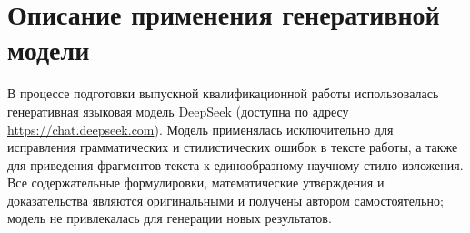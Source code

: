 \documentclass{article}
\theoremstyle{definition}
\begin{document}
\section*{Описание применения генеративной модели}

В процессе подготовки выпускной квалификационной работы использовалась генеративная языковая модель DeepSeek (доступна по адресу \url{https://chat.deepseek.com}). Модель применялась исключительно для исправления грамматических и стилистических ошибок в тексте работы, а также для приведения фрагментов текста к единообразному научному стилю изложения. Все содержательные формулировки, математические утверждения и доказательства являются оригинальными и получены автором самостоятельно; модель не привлекалась для генерации новых результатов.



\newpage


\end{document}
